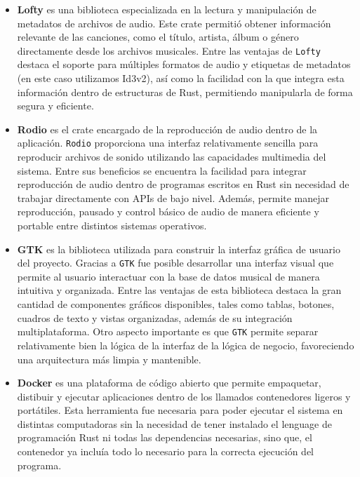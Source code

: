 \documentclass[12pt]{article}
\begin{document}
\begin{itemize}
\item \textbf{Lofty} es una biblioteca especializada en la lectura y manipulación de metadatos de archivos de audio. Este crate permitió obtener información relevante de las canciones, como el título, artista, álbum o género directamente desde los archivos musicales. Entre las ventajas de \texttt{Lofty} destaca el soporte para múltiples formatos de audio y etiquetas de metadatos (en este caso utilizamos Id3v2), así como la facilidad con la que integra esta información dentro de estructuras de Rust, permitiendo manipularla de forma segura y eficiente.

\item \textbf{Rodio} es el crate encargado de la reproducción de audio dentro de la aplicación. \texttt{Rodio} proporciona una interfaz relativamente sencilla para reproducir archivos de sonido utilizando las capacidades multimedia del sistema. Entre sus beneficios se encuentra la facilidad para integrar reproducción de audio dentro de programas escritos en Rust sin necesidad de trabajar directamente con APIs de bajo nivel. Además, permite manejar reproducción, pausado y control básico de audio de manera eficiente y portable entre distintos sistemas operativos.

\item \textbf{GTK} es la biblioteca utilizada para construir la interfaz gráfica de usuario del proyecto. Gracias a \texttt{GTK} fue posible desarrollar una interfaz visual que permite al usuario interactuar con la base de datos musical de manera intuitiva y organizada. Entre las ventajas de esta biblioteca destaca la gran cantidad de componentes gráficos disponibles, tales como tablas, botones, cuadros de texto y vistas organizadas, además de su integración multiplataforma. Otro aspecto importante es que \texttt{GTK} permite separar relativamente bien la lógica de la interfaz de la lógica de negocio, favoreciendo una arquitectura más limpia y mantenible.

  
  \item \textbf{Docker} es una plataforma de código abierto que permite empaquetar, distibuir y ejecutar aplicaciones dentro de los llamados contenedores ligeros y portátiles. Esta herramienta fue necesaria para poder ejecutar el sistema en distintas computadoras sin la necesidad de tener instalado el lenguage de programación Rust ni todas las dependencias necesarias, sino que, el contenedor ya incluía todo lo necesario para la correcta ejecución del programa.
  

\end{itemize}
\end{document}
